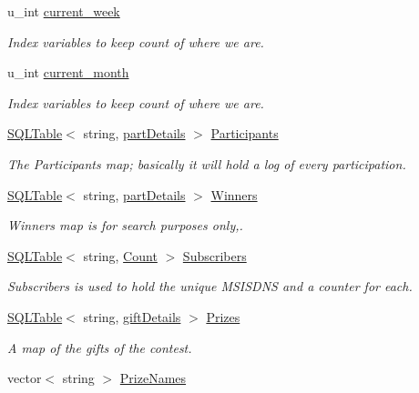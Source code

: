 \begin{CompactItemize}
u\_\-int \hyperlink{classContest_Contestm6}{current\_\-week}
\begin{CompactList}\small\item\em Index variables to keep count of where we are.\item\end{CompactList}\item 
u\_\-int \hyperlink{classContest_Contestm7}{current\_\-month}
\begin{CompactList}\small\item\em Index variables to keep count of where we are.\item\end{CompactList}\item 
\hyperlink{classSQLTable}{SQLTable}$<$ string, \hyperlink{classpartDetails}{part\-Details} $>$ \hyperlink{classContest_Contestm8}{Participants}
\begin{CompactList}\small\item\em The Participants map; basically it will hold a log of every participation.\item\end{CompactList}\item 
\hyperlink{classSQLTable}{SQLTable}$<$ string, \hyperlink{classpartDetails}{part\-Details} $>$ \hyperlink{classContest_Contestm9}{Winners}
\begin{CompactList}\small\item\em Winners map is for search purposes only,.\item\end{CompactList}\item 
\hyperlink{classSQLTable}{SQLTable}$<$ string, \hyperlink{classCount}{Count} $>$ \hyperlink{classContest_Contestm10}{Subscribers}
\begin{CompactList}\small\item\em Subscribers is used to hold the unique MSISDNS and a counter for each.\item\end{CompactList}\item 
\hyperlink{classSQLTable}{SQLTable}$<$ string, \hyperlink{classgiftDetails}{gift\-Details} $>$ \hyperlink{classContest_Contestm11}{Prizes}
\begin{CompactList}\small\item\em A map of the gifts of the contest.\item\end{CompactList}\item 
vector$<$ string $>$ \hyperlink{classContest_Contestm12}{Prize\-Names}

\end{CompactItemize}
